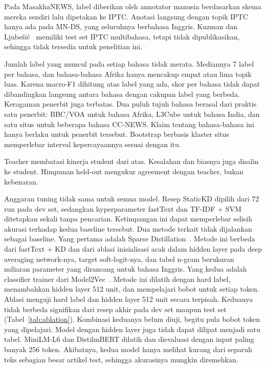 \documentclass[journal]{IEEEtran}
\begin{document}
Pada MasakhaNEWS, label diberikan oleh annotator manusia berdasarkan skema mereka sendiri lalu dipetakan ke IPTC. Anotasi langsung dengan topik IPTC hanya ada pada MN-DS, yang seluruhnya berbahasa Inggris. Kuzman dan Ljube\v{s}i\'c~\cite{kuzman2025llm} memiliki test set IPTC multibahasa, tetapi tidak dipublikasikan, sehingga tidak tersedia untuk penelitian ini.

Jumlah label yang muncul pada setiap bahasa tidak merata. Mediannya 7 label per bahasa, dan bahasa-bahasa Afrika hanya mencakup empat atau lima topik luas. Karena macro-F1 dihitung atas label yang ada, skor per bahasa tidak dapat dibandingkan langsung antara bahasa dengan cakupan label yang berbeda. Keragaman penerbit juga terbatas. Dua puluh tujuh bahasa berasal dari praktis satu penerbit: BBC/VOA untuk bahasa Afrika, L3Cube untuk bahasa India, dan satu situs untuk beberapa bahasa CC-NEWS. Klaim tentang bahasa-bahasa ini hanya berlaku untuk penerbit tersebut. Bootstrap berbasis klaster situs memperlebar interval kepercayaannya sesuai dengan itu.

Teacher membatasi kinerja student dari atas. Kesalahan dan biasnya juga disalin ke student. Himpunan held-out mengukur agreement dengan teacher, bukan kebenaran.

Anggaran tuning tidak sama untuk semua model. Resep StaticKD dipilih dari 72 run pada dev set, sedangkan hyperparameter fastText dan TF-IDF + SVM ditetapkan sekali tanpa pencarian. Ketimpangan ini dapat memperlebar selisih akurasi terhadap kedua baseline tersebut. Dua metode terkait tidak dijalankan sebagai baseline. Yang pertama adalah Sparse Distillation~\cite{ye2022sparse}. Metode ini berbeda dari fastText + KD dan dari ablasi inisialisasi acak dalam hidden layer pada deep averaging network-nya, target soft-logit-nya, dan tabel n-gram berukuran miliaran parameter yang dirancang untuk bahasa Inggris. Yang kedua adalah classifier trainer dari Model2Vec~\cite{tulkens2024model2vec}. Metode ini dilatih dengan hard label, menambahkan hidden layer 512 unit, dan mempelajari bobot untuk setiap token. Ablasi menguji hard label dan hidden layer 512 unit secara terpisah. Keduanya tidak berbeda signifikan dari resep akhir pada dev set maupun test set (Tabel~\ref{tab:ablation}). Kombinasi keduanya belum diuji, begitu pula bobot token yang dipelajari. Model dengan hidden layer juga tidak dapat dilipat menjadi satu tabel. MiniLM-L6 dan DistilmBERT dilatih dan dievaluasi dengan input paling banyak 256 token. Akibatnya, kedua model hanya melihat kurang dari separuh teks sebagian besar artikel test, sehingga akurasinya mungkin diremehkan.
\end{document}
